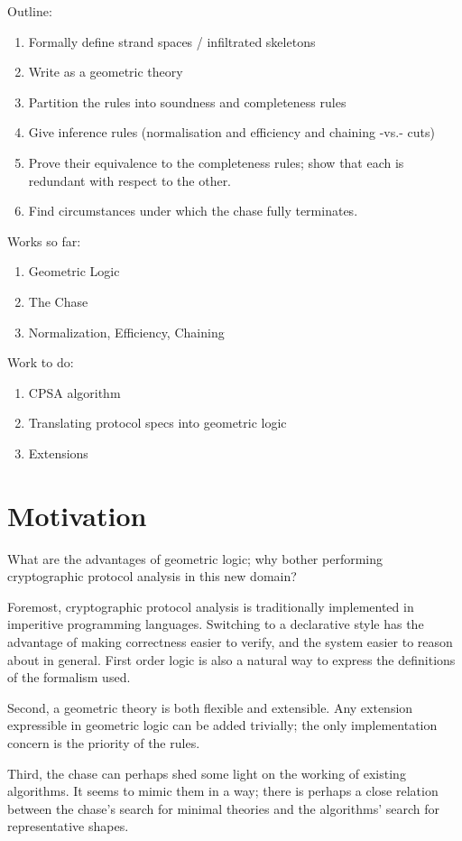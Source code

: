\documentclass[12pt]{article}
\begin{document}
Outline:
\begin{enumerate}
\item Formally define strand spaces / infiltrated skeletons
\item Write as a geometric theory
\item Partition the rules into soundness and completeness rules
\item Give inference rules (normalisation and efficiency and chaining
  -vs.- cuts)
\item Prove their equivalence to the completeness rules; show that
  each is redundant with respect to the other.
\item Find circumstances under which the chase fully terminates.
\end{enumerate}

Works so far:
\begin{enumerate}
\item Geometric Logic
\item The Chase
\item Normalization, Efficiency, Chaining
\end{enumerate}

Work to do:
\begin{enumerate}
\item CPSA algorithm
\item Translating protocol specs into geometric logic
\item Extensions
\end{enumerate}

\section{Motivation}

  What are the advantages of geometric logic; why bother performing
  cryptographic protocol analysis in this new domain?

  Foremost, cryptographic protocol analysis is traditionally
  implemented in imperitive programming languages. Switching to a
  declarative style has the advantage of making correctness easier to
  verify, and the system easier to reason about in general. First
  order logic is also a natural way to express the definitions of the
  formalism used.

  Second, a geometric theory is both flexible and extensible. Any
  extension expressible in geometric logic can be added trivially; the
  only implementation concern is the priority of the rules.

  Third, the chase can perhaps shed some light on the working of
  existing algorithms. It seems to mimic them in a way; there is
  perhaps a close relation between the chase's search for minimal
  theories and the algorithms' search for representative shapes.
\end{document}
